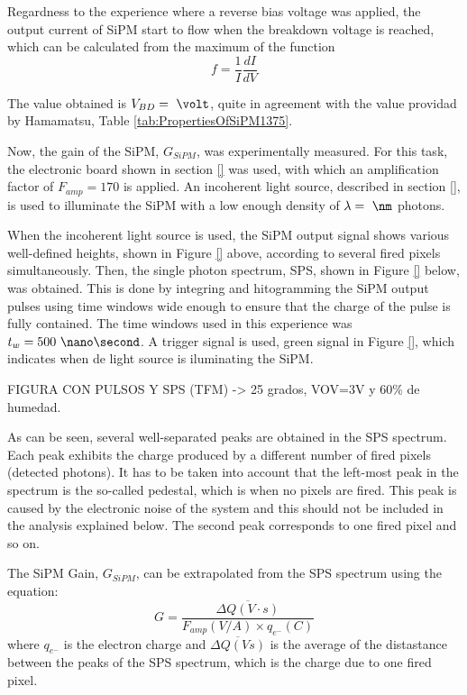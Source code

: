 Regardness to the experience where a reverse bias voltage was applied, the output current of SiPM start to flow when the breakdown voltage is reached, which can be calculated from the maximum of the function 
\begin{equation}
f=\frac{1}{I}\frac{dI}{dV}
\label{BreakDownVoltageFunction}
\end{equation}

The value obtained is $V_{BD}=~\volt$, quite in agreement with the value providad by Hamamatsu, Table \ref{tab:PropertiesOfSiPM1375}.

Now, the gain of the SiPM, $G_{SiPM}$, was experimentally measured. For this task, the electronic board shown in section \ref{} was used, with which an amplification factor of $F_{amp}=170$ is applied. An incoherent light source, described in section \ref{}, is used to illuminate the SiPM with a low enough density of $\lambda= ~\nm$ photons.

When the incoherent light source is used, the SiPM output signal shows various well-defined heights, shown in Figure \ref{} above, according to several fired pixels simultaneously. Then, the single photon spectrum, SPS, shown in Figure \ref{} below, was obtained. This is done by integring and hitogramming the SiPM output pulses using time windows wide enough to ensure that the charge of the pulse is fully contained. The time windows used in this experience was $t_w= 500~\nano\second$. A trigger signal is used, green signal in Figure \ref{}, which indicates when de light source is iluminating the SiPM.

FIGURA CON PULSOS Y SPS (TFM) -> 25 grados, VOV=3V y 60\% de humedad.

As can be seen, several well-separated peaks are obtained in the SPS spectrum. Each peak exhibits the charge produced by a different number of fired pixels (detected photons). It has to be taken into account that the left-most peak in the spectrum is the so-called pedestal, which is when no pixels are fired. This peak is caused by the electronic noise of the system and this should not be included in the analysis explained below. The second peak corresponds to one fired pixel and so on.

The SiPM Gain, $G_{SiPM}$, can be extrapolated from the SPS spectrum using the equation:
\begin{equation}
G=\frac{\overline{\Delta Q (V \cdot{} s)}}{F_{amp}(V/A) \times q_{e^-}(C)}
\label{SiPMGain}
\end{equation}
where $q_{e^-}$ is the electron charge and $\overline{\Delta Q (Vs)}$ is the average of the distastance between the peaks of the SPS spectrum, which is the charge due to one fired pixel. 


